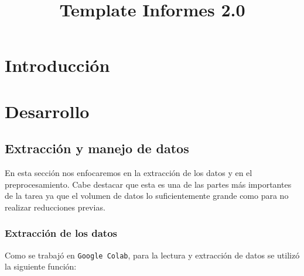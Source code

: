 

\title{Template Informes 2.0} %
\newcommand{\ramo}{EL4106 Inteligencia Computacional}
\newcommand{\departamento}{Departamento de Ingeniería Eléctrica}
\newcommand{\semestre}{Semestre Otoño 2019}

\newcommand{\hipertitulo}{}
\newcommand{\titulo}{Informe práctica profesional 1}
\newcommand{\subtitulo}{Banco Santander}

\newcommand{\autor}{Diego Irarrázaval I.}










\setcounter{page}{1}
\tableofcontents 
\newpage
\listoffigures
\listoftables
\lstlistoflistings


\newpage
{}
\setcounter{page}{1}

\newpage
\section{Introducción}
\newpage
\section{Desarrollo}
\subsection{Extracción y manejo  de datos}
\par En esta sección nos enfocaremos en la extracción de los datos y en el preprocesamiento. Cabe destacar que esta es una de las partes más importantes de la tarea ya que el volumen de datos lo suficientemente grande como para no realizar reducciones previas. 

\subsubsection{Extracción de los datos}
\par Como se trabajó en \texttt{Google Colab}, para la lectura y extracción de datos se utilizó la siguiente función:

